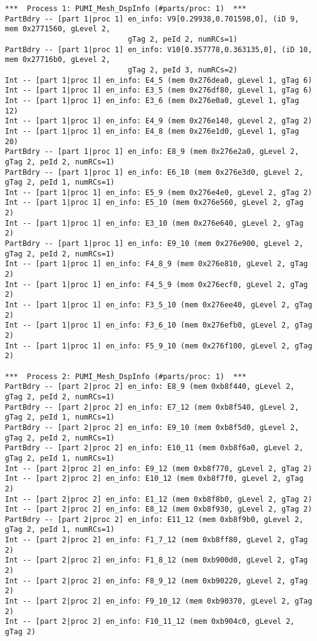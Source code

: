 \begin{small}
\begin{verbatim}
***  Process 1: PUMI_Mesh_DspInfo (#parts/proc: 1)  ***
PartBdry -- [part 1|proc 1] en_info: V9[0.29938,0.701598,0], (iD 9, mem 0x2771560, gLevel 2, 
                            gTag 2, peId 2, numRCs=1)
PartBdry -- [part 1|proc 1] en_info: V10[0.357778,0.363135,0], (iD 10, mem 0x27716b0, gLevel 2, 
                            gTag 2, peId 3, numRCs=2)
Int -- [part 1|proc 1] en_info: E4_5 (mem 0x276dea0, gLevel 1, gTag 6)
Int -- [part 1|proc 1] en_info: E3_5 (mem 0x276df80, gLevel 1, gTag 6)
Int -- [part 1|proc 1] en_info: E3_6 (mem 0x276e0a0, gLevel 1, gTag 12)
Int -- [part 1|proc 1] en_info: E4_9 (mem 0x276e140, gLevel 2, gTag 2)
Int -- [part 1|proc 1] en_info: E4_8 (mem 0x276e1d0, gLevel 1, gTag 20)
PartBdry -- [part 1|proc 1] en_info: E8_9 (mem 0x276e2a0, gLevel 2, gTag 2, peId 2, numRCs=1)
PartBdry -- [part 1|proc 1] en_info: E6_10 (mem 0x276e3d0, gLevel 2, gTag 2, peId 1, numRCs=1)
Int -- [part 1|proc 1] en_info: E5_9 (mem 0x276e4e0, gLevel 2, gTag 2)
Int -- [part 1|proc 1] en_info: E5_10 (mem 0x276e560, gLevel 2, gTag 2)
Int -- [part 1|proc 1] en_info: E3_10 (mem 0x276e640, gLevel 2, gTag 2)
PartBdry -- [part 1|proc 1] en_info: E9_10 (mem 0x276e900, gLevel 2, gTag 2, peId 2, numRCs=1)
Int -- [part 1|proc 1] en_info: F4_8_9 (mem 0x276e810, gLevel 2, gTag 2)
Int -- [part 1|proc 1] en_info: F4_5_9 (mem 0x276ecf0, gLevel 2, gTag 2)
Int -- [part 1|proc 1] en_info: F3_5_10 (mem 0x276ee40, gLevel 2, gTag 2)
Int -- [part 1|proc 1] en_info: F3_6_10 (mem 0x276efb0, gLevel 2, gTag 2)
Int -- [part 1|proc 1] en_info: F5_9_10 (mem 0x276f100, gLevel 2, gTag 2)

***  Process 2: PUMI_Mesh_DspInfo (#parts/proc: 1)  ***
PartBdry -- [part 2|proc 2] en_info: E8_9 (mem 0xb8f440, gLevel 2, gTag 2, peId 2, numRCs=1)
PartBdry -- [part 2|proc 2] en_info: E7_12 (mem 0xb8f540, gLevel 2, gTag 2, peId 1, numRCs=1)
PartBdry -- [part 2|proc 2] en_info: E9_10 (mem 0xb8f5d0, gLevel 2, gTag 2, peId 2, numRCs=1)
PartBdry -- [part 2|proc 2] en_info: E10_11 (mem 0xb8f6a0, gLevel 2, gTag 2, peId 1, numRCs=1)
Int -- [part 2|proc 2] en_info: E9_12 (mem 0xb8f770, gLevel 2, gTag 2)
Int -- [part 2|proc 2] en_info: E10_12 (mem 0xb8f7f0, gLevel 2, gTag 2)
Int -- [part 2|proc 2] en_info: E1_12 (mem 0xb8f8b0, gLevel 2, gTag 2)
Int -- [part 2|proc 2] en_info: E8_12 (mem 0xb8f930, gLevel 2, gTag 2)
PartBdry -- [part 2|proc 2] en_info: E11_12 (mem 0xb8f9b0, gLevel 2, gTag 2, peId 1, numRCs=1)
Int -- [part 2|proc 2] en_info: F1_7_12 (mem 0xb8ff80, gLevel 2, gTag 2)
Int -- [part 2|proc 2] en_info: F1_8_12 (mem 0xb900d0, gLevel 2, gTag 2)
Int -- [part 2|proc 2] en_info: F8_9_12 (mem 0xb90220, gLevel 2, gTag 2)
Int -- [part 2|proc 2] en_info: F9_10_12 (mem 0xb90370, gLevel 2, gTag 2)
Int -- [part 2|proc 2] en_info: F10_11_12 (mem 0xb904c0, gLevel 2, gTag 2)
\end{verbatim}
\end{small}
